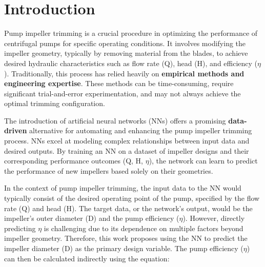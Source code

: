 \documentclass[
  super,
  review,
  3p]{elsarticle}
\begin{document}
\begin{nomenclature}
\begin{deflist}[AA] %

\end{deflist}

\begin{deflist}[AAA] %

\end{deflist}
\end{nomenclature}

\section{Introduction}\label{introduction}

Pump impeller trimming is a crucial procedure in optimizing the
performance of centrifugal pumps for specific operating conditions. It
involves modifying the impeller geometry, typically by removing material
from the blades, to achieve desired hydraulic characteristics such as
flow rate (Q), head (H), and efficiency (\(\eta\)). Traditionally, this
process has relied heavily on \textbf{empirical methods and engineering
expertise}. These methods can be time-consuming, require significant
trial-and-error experimentation, and may not always achieve the optimal
trimming configuration.

The introduction of artificial neural networks (NNs) offers a promising
\textbf{data-driven} alternative for automating and enhancing the pump
impeller trimming process. NNs excel at modeling complex relationships
between input data and desired outputs. By training an NN on a dataset
of impeller designs and their corresponding performance outcomes (Q, H,
\(\eta\)), the network can learn to predict the performance of new
impellers based solely on their geometries.

In the context of pump impeller trimming, the input data to the NN would
typically consist of the desired operating point of the pump, specified
by the flow rate (Q) and head (H). The target data, or the network's
output, would be the impeller's outer diameter (D) and the pump
efficiency (\(\eta\)). However, directly predicting \(\eta\) is
challenging due to its dependence on multiple factors beyond impeller
geometry. Therefore, this work proposes using the NN to predict the
impeller diameter (D) as the primary design variable. The pump
efficiency (\(\eta\)) can then be calculated indirectly using the
equation:
\end{document}
